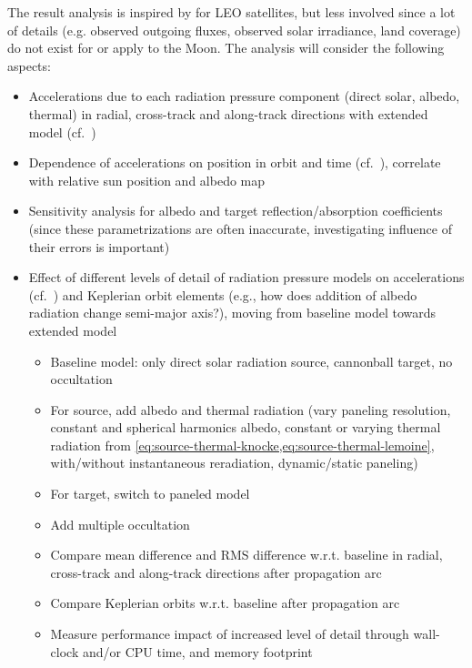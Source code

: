 \documentclass[parskip=full,DIV=15]{scrartcl}
\begin{document}
The result analysis is inspired by \textcite{Vielberg2020} for LEO satellites, but less involved since a lot of details (e.g. observed outgoing fluxes, observed solar irradiance, land coverage) do not exist for or apply to the Moon. The analysis will consider the following aspects:
\begin{itemize}
   \item Accelerations due to each radiation pressure component (direct solar, albedo, thermal) in radial, cross-track and along-track directions with extended model (cf.~\cite[Fig.~3]{Vielberg2020})
   \item Dependence of accelerations on position in orbit and time (cf.~\cite[Fig.~7]{Vielberg2020}), correlate with relative sun position and albedo map
   \item Sensitivity analysis for albedo and target reflection/absorption coefficients (since these parametrizations are often inaccurate, investigating influence of their errors is important)
   \item Effect of different levels of detail of radiation pressure models on accelerations (cf.~\cite[Fig.~8]{Vielberg2020}) and Keplerian orbit elements (e.g., how does addition of albedo radiation change semi-major axis?), moving from baseline model towards extended model
   \begin{itemize}
      \item Baseline model: only direct solar radiation source, cannonball target, no occultation
      \item For source, add albedo and thermal radiation (vary paneling resolution, constant and spherical harmonics albedo, constant or varying thermal radiation from \cref{eq:source-thermal-knocke,eq:source-thermal-lemoine}, with/without instantaneous reradiation, dynamic/static paneling)
      \item For target, switch to paneled model
      \item Add multiple occultation
      \item Compare mean difference and RMS difference w.r.t. baseline in radial, cross-track and along-track directions after propagation arc
      \item Compare Keplerian orbits w.r.t. baseline after propagation arc
      \item Measure performance impact of increased level of detail through wall-clock and/or CPU time, and memory footprint
   \end{itemize}
\end{itemize}
\end{document}
